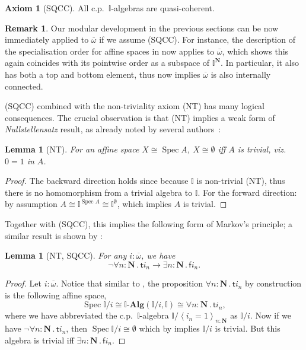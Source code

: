 \documentclass[a4paper,12pt]{amsart}
\newtheorem{lemma}[theorem]{Lemma}
\theoremstyle{definition}
\newtheorem{remark}[theorem]{Remark}
\newtheorem*{axiom}{Axiom}
\newcommand{\mb}[1]{\mathbf{#1}}
\newcommand{\mbb}[1]{\mathbb{#1}}
\newcommand{\I}{\mbb I}
\newcommand{\ms}[1]{\mathsf{#1}}
\newcommand{\alg}{\text{-}\mb{Alg}}
\newcommand{\ov}[1]{\overline{#1}}
\newcommand{\pair}[1]{\left\langle#1\right\rangle}
\newcommand{\N}{\mb N}
\newcommand{\fa}[2]{\forall #1\!\colon\!\!#2\mathpunct{.}}
\newcommand{\ex}[2]{\exists #1\!\colon\!\!#2\mathpunct{.}}
\newcommand{\emp}{\emptyset}
\newcommand{\spec}{\operatorname{Spec}}
\begin{document}
\begin{axiom}[SQCC]
  All c.p.\ $\I$-algebras are quasi-coherent.
\end{axiom}

\begin{remark}
  Our modular development in the previous sections can be now immediately applied to $\ov\omega$ if we assume (SQCC). For instance, the description of the specialisation order for affine spaces in  now applies to $\ov\omega$, which shows this again coincides with its pointwise order as a subspace of $\I^\N$. In particular, it also has both a top and bottom element, thus  now implies $\ov\omega$ is also internally connected. 
\end{remark}

(SQCC) combined with the non-triviality axiom (NT) has many logical consequences. The crucial observation is that (NT) implies a weak form of \emph{Nullstellensatz} result, as already noted by several authors~\cite{blechschmidt2021using,blechschmidt2020general,Cherubini_Coquand_Hutzler_2024}:

\begin{lemma}[NT]\label{lem:nulls}
  For an affine space $X \cong \spec A$, $X \cong \emp$ iff $A$ is trivial, viz.\ $0=1$ in $A$.
\end{lemma}
\begin{proof}
  The backward direction holds since because $\I$ is non-trivial (NT), thus there is no homomorphism from a trivial algebra to $\I$. For the forward direction: by assumption $A \cong \I^{\spec A} \cong \I^\emp$, which implies $A$ is trivial. 
\end{proof}

Together with (SQCC), this implies the following form of Markov's principle; a similar result is shown by \citet{cherubini2024foundation}:

\begin{lemma}[NT, SQCC]\label{lem:markov}
  For any $i : \ov\omega$, we have
  \[ \neg\fa{n}{\N}\ms ti_n \to \ex n\N\ms fi_n. \]
\end{lemma}
\begin{proof}
  Let $i : \ov\omega$. Notice that similar to , the proposition $\fa n\N \ms ti_n$ by construction is the following affine space, 
  \[ \spec\I/i \cong \I\alg(\I/i,\I) \cong \fa n\N \ms ti_n, \]
  where we have abbreviated the c.p.\ $\I$-algebra $\I/\pair{i_n=1}_{n:\N}$ as $\I/i$. Now if we have $\neg\fa n\N \ms ti_n$, then $\spec\I/i \cong \emp$ which by  implies $\I/i$ is trivial. But this algebra is trivial iff $\ex n\N \ms fi_n$.
\end{proof}
\end{document}
